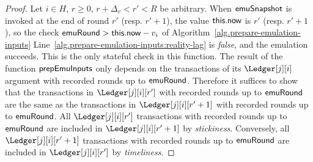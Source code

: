 \begin{proof}
  Let $i \in H$, $r \geq 0$, $r + \Delta_v < r' < R$ be arbitrary.
  When $\textsf{emuSnapshot}$ is invoked at the end of round $r'$ (resp. $r' + 1$),
  the value $\textsf{this}.\textsf{now}$
  is $r'$ (resp. $r' + 1$), so the check $\textsf{emuRound} > \textsf{this}.\textsf{now} - v_i$ of Algorithm~\ref{alg.prepare-emulation-inputs}
  Line~\ref{alg.prepare-emulation-inputs:reality-lag} is \emph{false}, and the emulation
  succeeds. This is the only stateful check in this function.
  The result of the function $\textsf{prepEmuInputs}$ only depends on the transactions of
  its $\Ledger[j][i]$ argument with recorded rounds up to $\textsf{emuRound}$.
  Therefore it suffices to show that the transactions in
  $\Ledger[j][i][r']$ with recorded rounds up to $\textsf{emuRound}$ are the same
  as the transactions in $\Ledger[j][i][r' + 1]$ with recorded rounds up to $\textsf{emuRound}$.
  All $\Ledger[j][i][r']$ transactions with recorded rounds up to $\textsf{emuRound}$
  are included in $\Ledger[j][i][r' + 1]$ by \emph{stickiness}.
  Conversely, all $\Ledger[j][i][r' + 1]$ transactions with recorded rounds up to $\textsf{emuRound}$
  are included in $\Ledger[j][i][r']$ by \emph{timeliness}.\Qed
\end{proof}

